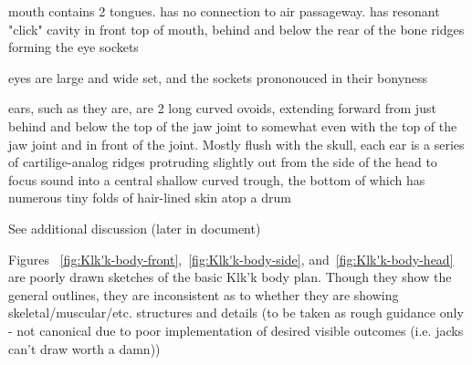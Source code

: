mouth contains 2 tongues. has no connection to air passageway. has
resonant "click" cavity in front top of mouth, behind and below the
rear of the bone ridges forming the eye sockets

eyes are large and wide set, and the sockets prononouced in their
bonyness

ears, such as they are, are 2 long curved ovoids, extending forward
from just behind and below the top of the jaw joint to somewhat even
with the top of the jaw joint and in front of the joint.  Mostly flush
with the skull, each ear is a series of cartilige-analog ridges
protruding slightly out from the side of the head to focus sound into
a central shallow curved trough, the bottom of which has numerous tiny
folds of hair-lined skin atop a drum

See additional discussion (later in document)

Figures ~\ref{fig:Klk'k-body-front},~\ref{fig:Klk'k-body-side}, and~\ref{fig:Klk'k-body-head} are poorly drawn sketches of the basic Klk'k body plan. Though
they show the general outlines, they are inconsistent as to whether
they are showing skeletal/muscular/etc. structures and details (to be
taken as rough guidance only - not canonical due to poor
implementation of desired visible outcomes (i.e. jacks can't draw
worth a damn))

